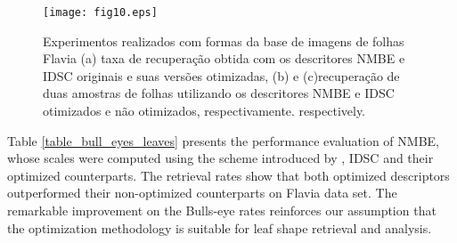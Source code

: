 {\begin{figure}[]
\caption{Experimentos realizados com formas da base de imagens de folhas Flavia (a) taxa de recuperação  obtida com os descritores NMBE e IDSC originais e suas versões otimizadas, (b) e (c)recuperação de duas amostras de folhas utilizando os descritores NMBE e IDSC otimizados e não otimizados, respectivamente.  respectively.\label{fig1Ooptimization_graph}}
\texttt{[image: fig10.eps]}
\end{figure}

 Table \ref{table_bull_eyes_leaves} presents the performance evaluation of NMBE, whose scales were computed using the scheme introduced by , IDSC and their optimized counterparts.  The retrieval rates show that both optimized descriptors outperformed their non-optimized counterparts on Flavia data set. The remarkable improvement on the Bulls-eye rates reinforces our assumption that the optimization methodology is suitable for leaf shape retrieval and analysis.

}
